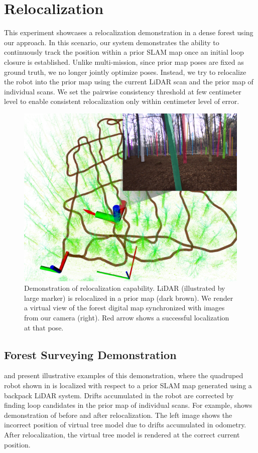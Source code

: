 \section{Relocalization} 
\label{sec:exp_relocalization}
This experiment showcases a relocalization demonstration in a dense forest using our approach. In this scenario, our system demonstrates the ability to continuously track the position within a prior SLAM map once an initial loop closure is established. Unlike multi-mission, since prior map poses are fixed as ground truth,  we no longer jointly optimize poses.
Instead, we try to relocalize the robot into the prior map using the current LiDAR scan and the prior map of individual scans. We set the pairwise consistency threshold at few centimeter level to enable consistent relocalization only within centimeter level of error. 
\begin{figure}[htbp]
  \centering
  \includegraphics[width=0.80\linewidth]{pics/exp_4_relocalization_demo.png}
  \caption{Demonstration of relocalization capability. LiDAR (illustrated by large marker) is relocalized in a prior map (dark brown). We render a virtual view of the forest digital map synchronized with images from our camera (right). Red arrow shows a successful localization at that pose.}
  \label{fig:relocalization_demo}
\end{figure}

\subsection*{Forest Surveying Demonstration}
 and  present illustrative examples of this demonstration, where the quadruped robot shown in  is localized with respect to a prior SLAM map generated using a backpack LiDAR system. Drifts accumulated in the robot are corrected by finding loop candidates in the prior map of individual scans. For example,   shows demonstration of before and after relocalization. The left image shows the incorrect position of virtual tree model due to drifts accumulated in odometry. After relocalization, the virtual tree model is rendered at the correct current position. 

